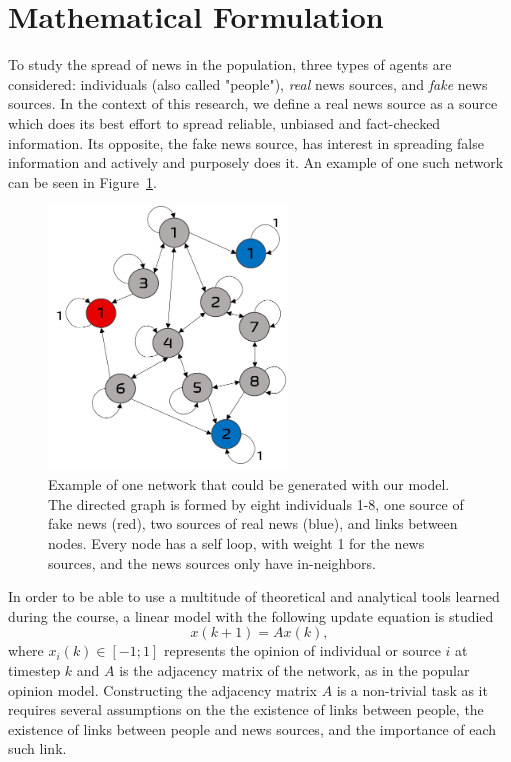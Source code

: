 \section{Mathematical Formulation}
\label{sec:mathematical}
To study the spread of news in the population, three types of agents are considered: individuals (also called "people"), \textit{real} news sources, and \textit{fake} news sources. In the context of this research, we define a real news source as a source which does its best effort to spread reliable, unbiased and fact-checked information. Its opposite, the fake news source, has interest in spreading false information and actively and purposely does it. An example of one such network can be seen in Figure~\ref{pics:network_example}.

\begin{figure}
\centering
\includegraphics[width=2.5in]{Figures/network_example.png}
\caption{Example of one network that could be generated with our model. The directed graph is formed by eight individuals 1-8, one source of fake news (red), two sources of real news (blue), and links between nodes. Every node has a self loop, with weight 1 for the news sources, and the news sources only have in-neighbors.}
\label{pics:network_example}
\end{figure}
In order to be able to use a multitude of theoretical and analytical tools learned during the course, a linear model with the following update equation is studied
\begin{equation}
x(k+1) = A x(k),
\end{equation}
where $x_i(k) \in [-1;1]$ represents the opinion of individual or source  $i$ at timestep $k$ and $A$ is the adjacency matrix of the network, as in the popular opinion model\cite{Friedkin1990}.
Constructing the adjacency matrix $A$ is a non-trivial task as it requires several assumptions on the the existence of links between people, the existence of links between people and news sources, and the importance of each such link.
